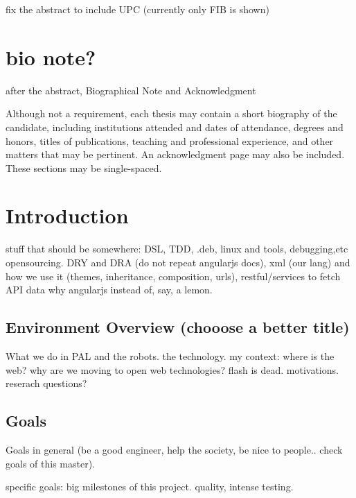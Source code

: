 
fix the abstract to include UPC (currently only FIB is shown)

\chapter{bio note?}
after the abstract, Biographical Note and Acknowledgment

Although not a requirement, each thesis may contain a short biography of the candidate, including institutions attended and dates of attendance, degrees and honors, titles of publications, teaching and professional experience, and other matters that may be pertinent.  An acknowledgment page may also be included.  These sections may be single-spaced.\cite{Darwin} \cite{Crockford} \cite{Stefanov} \cite{AngularJSGuide} \cite{Fowler}


\chapter{Introduction}
stuff that should be somewhere: DSL, TDD, .deb, linux and tools, debugging,etc opensourcing. DRY and DRA (do not repeat angularjs docs), xml (our lang) and how we use it (themes, inheritance, composition, urls), restful/services to fetch API data
why angularjs instead of, say, a lemon.

\section{Environment Overview (chooose a better title)}
What we do in PAL and the robots. the technology. my context: where is the web? why are we moving to open web technologies? flash is dead. motivations. reserach questions?

\section{Goals}
Goals in general (be a good engineer, help the society, be nice to people.. check goals of this master).

specific goals: big milestones of this project. quality, intense testing. 

